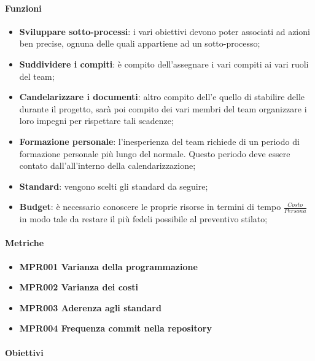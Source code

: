 		\paragraph*{Funzioni}
	
		\begin{itemize}
			\item \textbf{Sviluppare sotto-processi}: i vari obiettivi devono poter associati ad azioni ben precise, ognuna delle quali appartiene ad un sotto-processo;
			\item \textbf{Suddividere i compiti}: è compito dell'\Amm assegnare i vari compiti ai vari ruoli del team;
			\item \textbf{Candelarizzare i documenti}: altro compito dell'\Amm e quello di stabilire delle  durante il progetto, sarà poi compito dei vari membri del team organizzare i loro impegni per rispettare tali scadenze;
			\item \textbf{Formazione personale}: l'inesperienza del team richiede di un periodo di formazione personale più lungo del normale. Questo periodo deve essere contato dall'\Amm all'interno della calendarizzazione;
			\item \textbf{Standard}: vengono scelti gli standard da seguire;
			\item \textbf{Budget}: è necessario conoscere le proprie risorse in termini di tempo $\frac{Costo}{Persona}$ in modo tale da restare il più fedeli possibile al preventivo stilato;
		\end{itemize}
	
		\paragraph*{Metriche}
		
		\begin{itemize}
			\item \textbf{MPR001 Varianza della programmazione}
			\item \textbf{MPR002 Varianza dei costi}
			\item \textbf{MPR003 Aderenza agli standard}
			\item \textbf{MPR004 Frequenza commit nella repository}
		\end{itemize}
	
		\paragraph*{Obiettivi}
		
